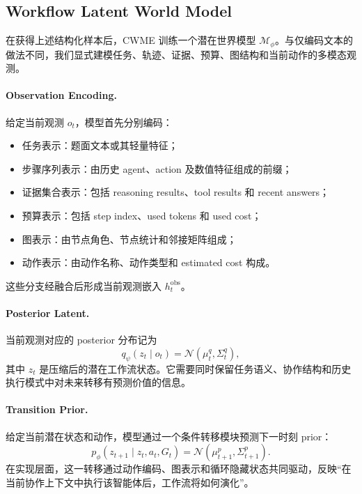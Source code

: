 \subsection{Workflow Latent World Model}

在获得上述结构化样本后，CWME 训练一个潜在世界模型 $\mathcal{M}_\phi$。与仅编码文本的做法不同，我们显式建模任务、轨迹、证据、预算、图结构和当前动作的多模态观测。

\paragraph{Observation Encoding.}
给定当前观测 $o_t$，模型首先分别编码：
\begin{itemize}
    \item 任务表示：题面文本或其轻量特征；
    \item 步骤序列表示：由历史 agent、action 及数值特征组成的前缀；
    \item 证据集合表示：包括 reasoning results、tool results 和 recent answers；
    \item 预算表示：包括 step index、used tokens 和 used cost；
    \item 图表示：由节点角色、节点统计和邻接矩阵组成；
    \item 动作表示：由动作名称、动作类型和 estimated cost 构成。
\end{itemize}
这些分支经融合后形成当前观测嵌入 $h_t^{\text{obs}}$。

\paragraph{Posterior Latent.}
当前观测对应的 posterior 分布记为
\begin{equation}
    q_\psi(z_t \mid o_t) = \mathcal{N}(\mu_t^{q}, \Sigma_t^{q}),
\end{equation}
其中 $z_t$ 是压缩后的潜在工作流状态。它需要同时保留任务语义、协作结构和历史执行模式中对未来转移有预测价值的信息。

\paragraph{Transition Prior.}
给定当前潜在状态和动作，模型通过一个条件转移模块预测下一时刻 prior：
\begin{equation}
    p_\phi(z_{t+1} \mid z_t, a_t, G_t) = \mathcal{N}(\mu_{t+1}^{p}, \Sigma_{t+1}^{p}).
\end{equation}
在实现层面，这一转移通过动作编码、图表示和循环隐藏状态共同驱动，反映“在当前协作上下文中执行该智能体后，工作流将如何演化”。

